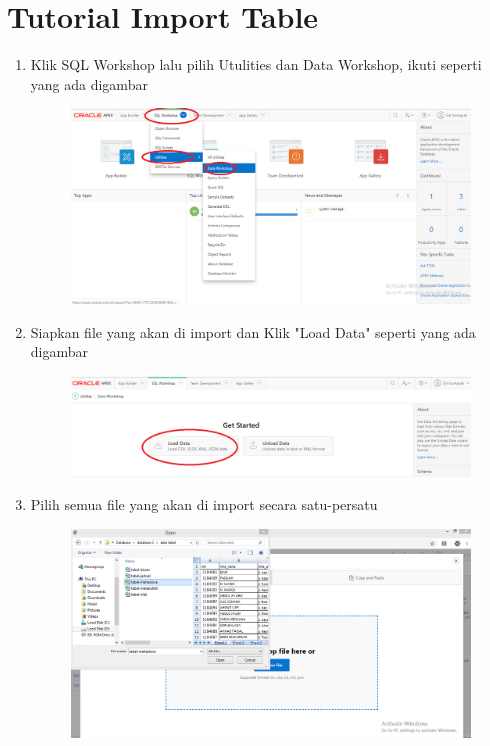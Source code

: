 \section*{Tutorial Import Table}
\begin{enumerate}
	
	\item Klik SQL Workshop lalu pilih Utulities dan Data Workshop, ikuti seperti yang ada digambar  
	\begin{figure} [!htbp]
	\includegraphics[scale=0.2]{Apex/12.png}
	\centering
	\end{figure}

	\item Siapkan file yang akan di import dan Klik "Load Data" seperti yang ada digambar   
	\begin{figure} [!htbp]
	\includegraphics[scale=0.2]{Apex/13.png}
	\centering
	\end{figure}
	
	\item Pilih semua file yang akan di import secara satu-persatu 
	\begin{figure} [!htbp]
	\includegraphics[scale=0.2]{Apex/14.png}
	\centering
	\end{figure}
	

\end{enumerate}
